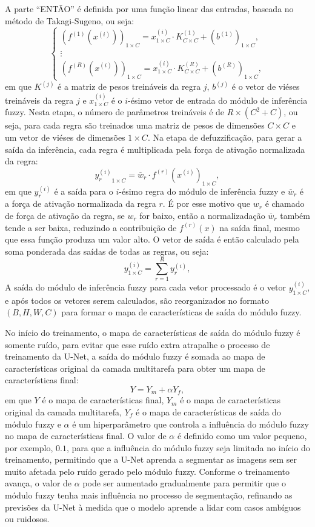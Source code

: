 A parte ``ENTÃO'' é definida por uma função linear das entradas, baseada no método de Takagi-Sugeno, ou seja:
$$
\begin{cases}
(f^{(1)}(x^{(i)}))_{1\times C} =  x^{(i)}_{1\times C} \cdot K^{(1)}_{C\times C}  + (b^{(1)})_{1\times C}, \\
\vdots \\
(f^{(R)}(x^{(i)}))_{1\times C} = x^{(i)}_{1\times C} \cdot K^{(R)}_{C\times C} + (b^{(R)})_{1\times C},
\end{cases}
$$
em que $K^{(j)}$ é a matriz de pesos treináveis da regra $j$, $b^{(j)}$ é o vetor de viéses treináveis da regra $j$ e $x^{(i)}_{1\times C}$ é o $i$-ésimo vetor de entrada do módulo de inferência fuzzy. 
Nesta etapa, o número de parâmetros treináveis é de $R \times (C^2 + C)$, ou seja, para cada regra são treinados uma matriz de pesos de dimensões $C\times C$ e um vetor de viéses de dimensões $1\times C$. Na etapa de defuzzificação, para gerar a saída da inferência, cada regra é multiplicada pela força de ativação normalizada da regra:
$$
{y^{(i)}_r}_{1\times C} = \overline{w}_r \cdot f^{(r)}(x^{(i)})_{1\times C},
$$
em que $y^{(i)}_r$ é a saída para o $i$-ésimo regra do módulo de inferência fuzzy e $\overline{w}_r$ é a força de ativação normalizada da regra $r$. É por esse motivo que $w_r$ é chamado de força de ativação da regra, se $w_r$ for baixo, então a normalizadação $\overline{w}_r$ também tende a ser baixa, reduzindo a contribuição de $f^{(r)}(x)$ na saída final, mesmo que essa função produza um valor alto. O vetor de saída é então calculado pela soma ponderada das saídas de todas as regras, ou seja:
$$
y^{(i)}_{1\times C} = \sum_{r=1}^{R} y^{(i)}_r,
$$
A saída do módulo de inferência fuzzy para cada vetor processado é o vetor $y^{(i)}_{1\times C}$, e após todos os vetores serem calculados, são reorganizados no formato $(B,H,W,C)$ para formar o mapa de características de saída do módulo fuzzy. 

No início do treinamento, o mapa de características de saída do módulo fuzzy é somente ruído, para evitar que esse ruído extra atrapalhe o processo de treinamento da U-Net, a saída do módulo fuzzy é somada ao mapa de características original da camada multitarefa para obter um mapa de características final:
$$
Y = Y_m + \alpha Y_f,
$$
em que $Y$ é o mapa de características final, $Y_m$ é o mapa de características original da camada multitarefa, $Y_f$ é o mapa de características de saída do módulo fuzzy e $\alpha$ é um hiperparâmetro que controla a influência do módulo fuzzy no mapa de características final. O valor de $\alpha$ é definido como um valor pequeno, por exemplo, $0.1$, para que a influência do módulo fuzzy seja limitada no início do treinamento, permitindo que a U-Net aprenda a segmentar as imagens sem ser muito afetada pelo ruído gerado pelo módulo fuzzy. Conforme o treinamento avança, o valor de $\alpha$ pode ser aumentado gradualmente para permitir que o módulo fuzzy tenha mais influência no processo de segmentação, refinando as previsões da U-Net à medida que o modelo aprende a lidar com casos ambíguos ou ruidosos.

